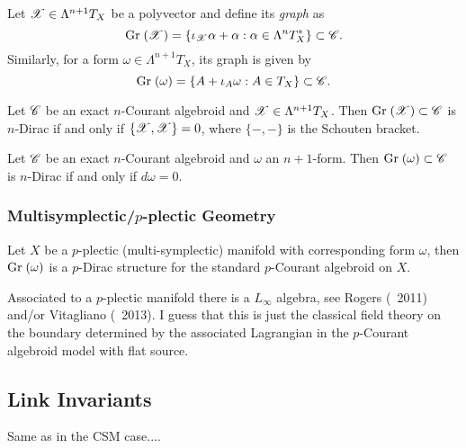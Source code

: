 Let $\mathscr X \in \Lambda^{n+1} T_X$ be a polyvector and define its {\it graph} as
\[
{\rm Gr}\; (\mathscr X) = \{ \iota_\mathscr X \alpha + \alpha : \alpha \in \Lambda^n T^\ast_X \} \subset \mathscr C.
\]
Similarly, for a form $\omega \in \Lambda^{n+1} T_X$, its graph is given by
\[
{\rm Gr}\; (\omega) = \{ A + \iota_A \omega : A \in T_X \} \subset \mathscr C.
\]

\begin{prop}
Let $\mathscr C$ be an exact $n$-Courant algebroid and $\mathscr X \in \Lambda^{n+1} T_X$. Then ${\rm Gr}\; (\mathscr X) \subset \mathscr C$ is $n$-Dirac if and only if $\{\mathscr X , \mathscr X\} = 0$, where $\{-,-\}$ is the Schouten bracket.
\end{prop}

\begin{prop}
Let $\mathscr C$ be an exact $n$-Courant algebroid and $\omega$ an $n+1$-form. Then ${\rm Gr}\; (\omega) \subset \mathscr C$ is $n$-Dirac if and only if $d \omega =0$.
\end{prop}


\subsubsection{Multisymplectic/$p$-plectic Geometry}

Let $X$ be a $p$-plectic (multi-symplectic) manifold with corresponding form $\omega$, then ${\rm Gr}\; (\omega)$ is a $p$-Dirac structure for the standard $p$-Courant algebroid on $X$.  

Associated to a $p$-plectic manifold there is a $L_\infty$ algebra, see Rogers (~2011) and/or Vitagliano (~2013).  I guess that this is just the classical field theory on the boundary determined by the associated Lagrangian in the $p$-Courant algebroid model with flat source.


\subsection{Link Invariants}

Same as in the CSM case....